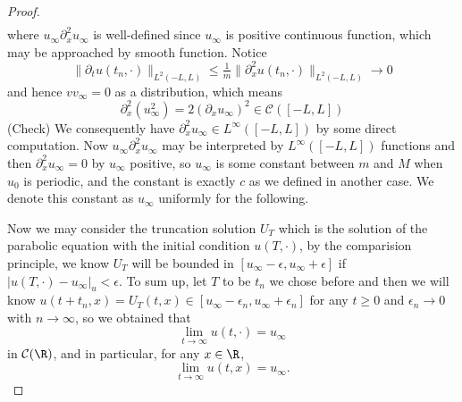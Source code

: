 \begin{proof}
\[\begin{aligned}
\end{aligned}
\]
where $u_{\infty}\partial_x^2 u_{\infty}$ is well-defined since $u_{\infty}$ is positive continuous function, which may be approached by smooth function. Notice
\[
\lVert \partial_t u(t_n,\cdot)\rVert_{L^2(-L,L)} \leq \tfrac1m \lVert\partial_x^2 u(t_n,\cdot)\rVert_{L^2(-L,L)} \to 0 
\]
and hence $vv_{\infty} = 0$ as a distribution, which means 
\[
\partial_x^2 (u_{\infty}^2) = 2 (\partial_x u_{\infty})^2 \in \mathcal{C}([-L,L])
\]
(Check) We consequently have $\partial_x^2 u_{\infty} \in L^{\infty}([-L,L])$ by some direct computation. Now $u_{\infty}\partial_x^2 u_{\infty}$ may be interpreted by $L^{\infty}([-L,L])$ functions and then $\partial_x^2 u_{\infty} = 0$ by $u_{\infty}$ positive, so $u_{\infty}$ is some constant between $m$ and $M$ when $u_0$ is periodic, and the constant is exactly $c$ as we defined in another case. We denote this constant as $u_{\infty}$ uniformly for the following.

Now we may consider the truncation solution $U_T$ which is the solution of the parabolic equation with the initial condition $u(T,\cdot)$, by the comparision principle, we know $U_T$ will be bounded in $[u_{\infty} -\epsilon, u_{\infty} + \epsilon]$ if $|u(T,\cdot) - u_{\infty}|_u < \epsilon$. To sum up, let $T$ to be $t_n$ we chose before and then we will know $u(t+t_n,x) = U_T(t,x) \in [u_{\infty} - \epsilon_n, u_{\infty} + \epsilon_n]$ for any $t\geq 0$ and $\epsilon_n \to 0$ with $n\to\infty$, so we obtained that \[ \lim_{t\to\infty} u(t,\cdot) = u_{\infty}\] in $\mathcal{C}(\R)$, and in particular, for any $x\in \R$, \[\lim_{t\to\infty} u(t,x) = u_{\infty}.\]
\end{proof}

